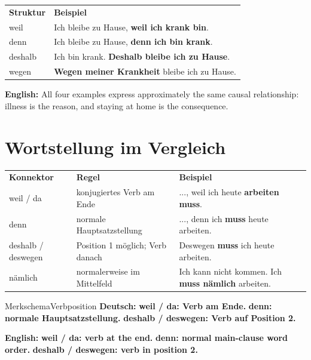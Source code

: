\documentclass[a4paper,11pt]{article}
\newcommand{\GermanText}[1]{\textbf{Deutsch: }#1\par}
\newcommand{\EnglishText}[1]{{\small\color{SoftGray}\textbf{English: }#1\par}}
\begin{document}
        \begin{longtable}{p{3.0cm}|p{11.8cm}}
            \rowcolor{HeaderBlueDark}
            \color{white}\textbf{Struktur} &
            \color{white}\textbf{Beispiel} \\
            weil & Ich bleibe zu Hause, \textbf{weil ich krank bin}. \\
            denn & Ich bleibe zu Hause, \textbf{denn ich bin krank}. \\
            deshalb & Ich bin krank. \textbf{Deshalb bleibe ich zu Hause}. \\
            wegen & \textbf{Wegen meiner Krankheit} bleibe ich zu Hause. \\
        \end{longtable}

        \EnglishText{All four examples express approximately the same causal relationship: illness is the reason, and staying at home is the consequence.}

    \section{Wortstellung im Vergleich}

        \begin{longtable}{p{2.4cm}|p{5.6cm}|p{6.8cm}}
            \rowcolor{HeaderBlueDark}
            \color{white}\textbf{Konnektor} &
            \color{white}\textbf{Regel} &
            \color{white}\textbf{Beispiel} \\
            weil / da & konjugiertes Verb am Ende & ..., weil ich heute \textbf{arbeiten muss}. \\
            denn & normale Hauptsatzstellung & ..., denn ich \textbf{muss} heute arbeiten. \\
            deshalb / deswegen & Position 1 möglich; Verb danach & Deswegen \textbf{muss} ich heute arbeiten. \\
            nämlich & normalerweise im Mittelfeld & Ich kann nicht kommen. Ich \textbf{muss nämlich} arbeiten. \\
        \end{longtable}

        \begin{grammarentry}{Merkschema}{Verbposition}
            \GermanText{\textbf{weil / da: Verb am Ende.} \quad \textbf{denn: normale Hauptsatzstellung.} \quad \textbf{deshalb / deswegen: Verb auf Position 2.}}
            \EnglishText{\textbf{weil / da: verb at the end.} \quad \textbf{denn: normal main-clause word order.} \quad \textbf{deshalb / deswegen: verb in position 2.}}
        \end{grammarentry}
\end{document}

